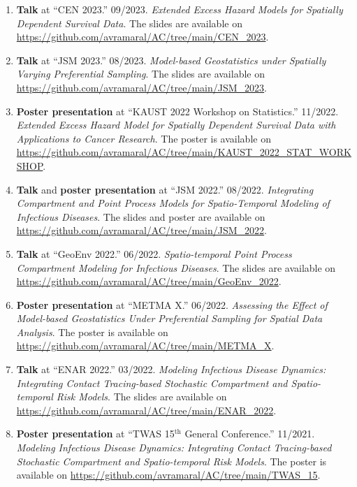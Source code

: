 \documentclass[10pt, ]{article}
\begin{document}
	\begin{enumerate}[noitemsep, topsep=0pt]
		\item \textbf{Talk} at ``CEN 2023.'' 09/2023. \textit{Extended Excess Hazard Models for Spatially Dependent Survival Data}. The slides are available on \href{https://github.com/avramaral/AC/tree/main/CEN\_2023}{\url{https://github.com/avramaral/AC/tree/main/CEN\_2023}}.
		
		\item \textbf{Talk} at ``JSM 2023.'' 08/2023. \textit{Model-based Geostatistics under Spatially Varying Preferential Sampling}. The slides are available on \href{https://github.com/avramaral/AC/tree/main/JSM\_2023}{\url{https://github.com/avramaral/AC/tree/main/JSM\_2023}}.
		
		\item \textbf{Poster presentation} at ``KAUST 2022 Workshop on Statistics.'' 11/2022. \textit{Extended Excess Hazard Model for Spatially Dependent Survival Data with Applications to Cancer Research}. The poster is available on \href{https://github.com/avramaral/AC/tree/main/KAUST_2022_STAT_WORKSHOP}{\url{https://github.com/avramaral/AC/tree/main/KAUST_2022_STAT_WORKSHOP}}.
		
		\item \textbf{Talk} and \textbf{poster presentation} at ``JSM 2022.'' 08/2022. \textit{Integrating Compartment and Point Process Models for Spatio-Temporal Modeling of Infectious Diseases}. The slides and poster are available on \href{https://github.com/avramaral/AC/tree/main/JSM\_2022}{\url{https://github.com/avramaral/AC/tree/main/JSM\_2022}}.
		
		\item \textbf{Talk} at ``GeoEnv 2022.'' 06/2022. \textit{Spatio-temporal Point Process Compartment Modeling for Infectious Diseases}. The slides are available on \href{https://github.com/avramaral/AC/tree/main/GeoEnv\_2022}{\url{https://github.com/avramaral/AC/tree/main/GeoEnv\_2022}}.
		
		\item \textbf{Poster presentation} at ``METMA X.'' 06/2022. \textit{Assessing the Effect of Model-based Geostatistics Under Preferential Sampling for Spatial Data Analysis}. The poster is available on \href{https://github.com/avramaral/AC/tree/main/METMA\_X}{\url{https://github.com/avramaral/AC/tree/main/METMA\_X}}.
		
		\item \textbf{Talk} at ``ENAR 2022.'' 03/2022. \textit{Modeling Infectious Disease Dynamics: Integrating Contact Tracing-based	Stochastic Compartment and Spatio-temporal Risk Models}. The slides are available on \href{https://github.com/avramaral/AC/tree/main/ENAR\_2022}{\url{https://github.com/avramaral/AC/tree/main/ENAR\_2022}}.
		
		\item \textbf{Poster presentation} at ``TWAS 15${}^{\text{th}}$ General Conference.'' 11/2021. \textit{Modeling Infectious Disease Dynamics: Integrating Contact Tracing-based	Stochastic Compartment and Spatio-temporal Risk Models}. The poster is available on \href{https://github.com/avramaral/AC/tree/main/TWAS\_15}{\url{https://github.com/avramaral/AC/tree/main/TWAS\_15}}.
	\end{enumerate}
\end{document}
